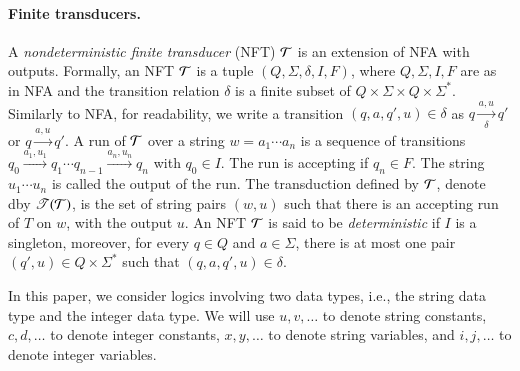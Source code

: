 

\paragraph*{Finite transducers.} A \emph{nondeterministic finite transducer} (NFT) $\mathcal{T}$ is an extension of NFA with outputs. Formally, an NFT $\mathcal{T}$ is a tuple $(Q, \Sigma, \delta, I, F)$, where $Q, \Sigma, I, F$ are as in NFA and the transition relation $\delta$ is a finite subset of $Q \times \Sigma \times Q \times \Sigma^*$. Similarly to NFA, for readability, we write a transition $(q, a, q', u) \in \delta$ as $q \xrightarrow[\delta]{a, u} q'$ or $q \xrightarrow{a, u} q'$. 
%
A run of $\mathcal{T}$ over a string $w=a_1 \cdots a_n$ is a sequence of transitions $q_0 \xrightarrow{a_1, u_1} q_1 \cdots q_{n-1} \xrightarrow{a_n, u_n} q_n$ with $q_0 \in I$. The run is accepting if $q_n \in F$. The string $u_1 \cdots u_n$ is called the output of the run. The transduction defined by $\mathcal{T}$, denote dby $\mathscr{T}(\mathcal{T})$, is the set of string pairs $(w, u)$ such that there is an accepting run of $T$ on $w$, with the output $u$. An NFT $\mathcal{T}$ is said to be \emph{deterministic} if $I$ is a singleton, moreover, for every $q \in Q$ and $a \in \Sigma$, there is at most one pair $(q', u) \in Q \times \Sigma^*$ such that $(q, a, q', u) \in \delta$.


\medskip

In this paper, we consider logics involving two data types, i.e., the string data type and the integer data type. We will use $u, v, \dots$ to denote string constants,  $c, d,\dots$ to denote integer constants, $x, y, \dots$ to denote string variables, and $i, j, \dots$ to denote  integer variables.


